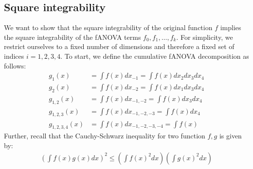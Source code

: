 \subsection*{Square integrability}

We want to show that the square integrability of the original function \( f \) implies the square integrability of the fANOVA terms \( f_0, f_1, \ldots, f_k \).
For simplicity, we restrict ourselves to a fixed number of dimensions and therefore a fixed set of indices $i = 1, 2, 3, 4$.
To start, we define the cumulative fANOVA decomposition as follows:
\begin{align}
    g_1(x) &= \int f(x) dx_{-1} = \int f(x) dx_2 dx_3 dx_4 \\
    g_2(x) &= \int f(x) dx_{-2} = \int f(x) dx_1 dx_3 dx_4 \\
    g_{1,2}(x) &= \int f(x) dx_{-1, -2} = \int f(x) dx_3 dx_4 \\
    g_{1,2,3}(x) &= \int f(x) dx_{-1, -2, -3} = \int f(x) dx_4 \\
    g_{1,2,3,4}(x) &= \int f(x) dx_{-1, -2, -3, -4} = \int f(x)
\end{align}
Further, recall that the Cauchy-Schwarz inequality for two function $f, g$ is given by:
\begin{align}
    \left( \int f(x) g(x) dx \right)^2 \leq \left( \int f(x)^2 dx \right) \left( \int g(x)^2 dx \right)
\end{align}


